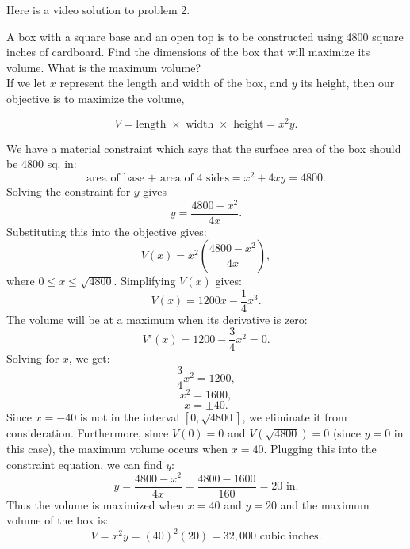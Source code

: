 \documentclass[handout]{ximera}
\begin{document}
Here is a video solution to problem 2.
\begin{foldable}
\end{foldable}

\begin{example}[example 3]
A box with a square base and an open top is to be constructed using 4800 square inches of cardboard.  
Find the dimensions of the box that will maximize its volume.  What is the maximum volume?\\

If we let $x$ represent the length and width of the box, and $y$ its height, then our objective is to maximize 
the volume,


\begin{image}
\end{image}

\[V = \text{length $\times$ width $\times$ height} = x^2y.\]

We have a material constraint which says that the surface area of the box should be 4800 sq. in:
\[\text{area of base + area of 4 sides} = x^2 + 4xy = 4800.\]
Solving the constraint for $y$ gives
\[y = \frac{4800 - x^2}{4x}.\]
Substituting this into the objective gives:
\[V(x) = x^2 \left(\frac{4800 - x^2}{4x}\right),\]
where $0\leq x \leq \sqrt{4800}$.
Simplifying $V(x)$ gives:
\[V(x) = 1200x - \frac14 x^3.\]
The volume will be at a maximum when its derivative is zero:
\[V'(x) = 1200 - \frac34 x^2 = 0.\]
Solving for $x$, we get:
\[ \frac34 x^2 = 1200, \]
\[x^2 = 1600,\]
\[x = \pm 40.\]
Since $x=-40$ is not in the interval $[0, \sqrt{4800}]$, we eliminate it from consideration. 
Furthermore, since $V(0) = 0$ and $V(\sqrt{4800})= 0$ (since $y=0$ in this case), the maximum volume occurs when $x = 40$.
Plugging this into the constraint equation, we can find $y$:
\[y = \frac{4800 - x^2}{4x} = \frac{4800 - 1600}{160} = 20 \mbox{ in.}\]
Thus the volume is maximized when $x = 40$ and $y = 20$ and the maximum volume of the box is:
\[V = x^2y = (40)^2 (20) = 32{,}000 \mbox{ cubic inches}.\]

\end{example}


\begin{center}
\begin{foldable}
\end{foldable}
\end{center}
\end{document}
